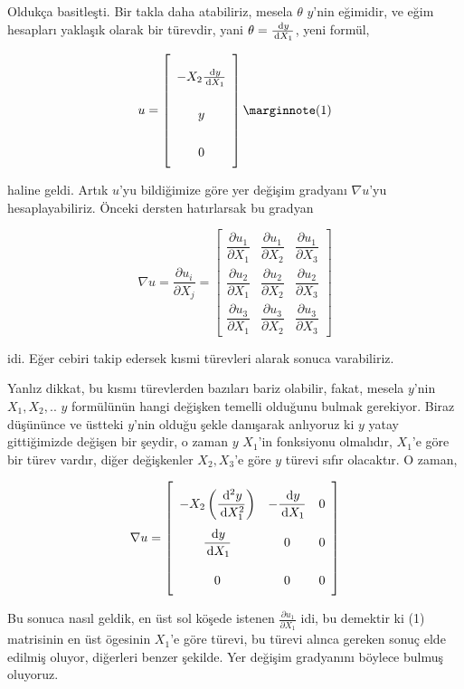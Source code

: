 \documentclass[12pt,fleqn]{article}\usepackage{../../common}
\begin{document}
Oldukça basitleşti. Bir takla daha atabiliriz, mesela $\theta$ $y$'nin eğimidir,
ve eğim hesapları yaklaşık olarak bir türevdir, yani $\theta = \frac{\,\mathrm{d} y}{\,\mathrm{d} X_1}$,
yeni formül,

$$
u = \left[\begin{array}{ccc}
-X_2 \frac{\ud y}{\ud X_1} \\ y \\ 0
\end{array}\right]
\mlabel{1}
$$

haline geldi. Artık $u$'yu bildiğimize göre yer değişim gradyanı $\nabla u$'yu
hesaplayabiliriz. Önceki dersten hatırlarsak bu gradyan

$$
\renewcommand*{\arraystretch}{2.5}
\nabla u = \frac{\partial u_i}{\partial X_j} =
\left[\begin{array}{ccc}
\dfrac{\partial u_1}{\partial X_1} & \dfrac{\partial u_1}{\partial X_2} & \dfrac{\partial u_1}{\partial X_3} \\
\dfrac{\partial u_2}{\partial X_1} & \dfrac{\partial u_2}{\partial X_2} & \dfrac{\partial u_2}{\partial X_3} \\
\dfrac{\partial u_3}{\partial X_1} & \dfrac{\partial u_3}{\partial X_2} & \dfrac{\partial u_3}{\partial X_3} 
\end{array}\right]
$$

idi. Eğer cebiri takip edersek kısmi türevleri alarak sonuca varabiliriz.

Yanlız dikkat, bu kısmı türevlerden bazıları bariz olabilir, fakat, mesela
$y$'nin $X_1,X_2,..$ $y$ formülünün hangi değişken temelli olduğunu bulmak
gerekiyor. Biraz düşününce ve üstteki $y$'nin olduğu şekle danışarak anlıyoruz
ki $y$ yatay gittiğimizde değişen bir şeydir, o zaman $y$ $X_1$'in fonksiyonu
olmalıdır, $X_1$'e göre bir türev vardır, diğer değişkenler $X_2,X_3$'e göre $y$
türevi sıfır olacaktır. O zaman,

$$
\renewcommand*{\arraystretch}{2.5}
\nabla u = \left[\begin{array}{ccc}
-X_2 \left( \dfrac{\ud^2 y}{\ud X_1^2} \right)  & - \dfrac{\ud y}{\ud X_1} & 0 \\ 
\dfrac{\ud y}{\ud X_1} & 0 & 0 \\ 
0 & 0 & 0
\end{array}\right]
$$

Bu sonuca nasıl geldik, en üst sol köşede istenen $\frac{\partial u_1}{\partial X_1}$
idi, bu demektir ki (1) matrisinin en üst ögesinin $X_1$'e göre türevi, bu
türevi alınca gereken sonuç elde edilmiş oluyor, diğerleri benzer şekilde.
Yer değişim gradyanını böylece bulmuş oluyoruz.
\end{document}
